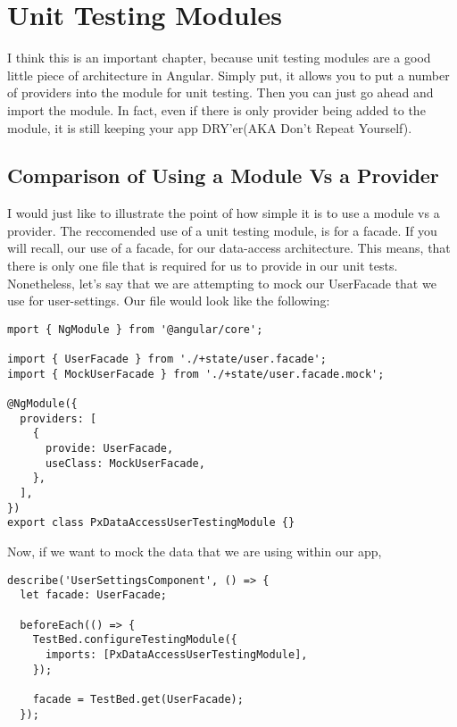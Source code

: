 \maketitle{}
\section{ Unit Testing Modules }
I think this is an important chapter, because unit testing modules are a good
little piece of architecture in Angular. Simply put, it allows you to put a
number of providers into the module for unit testing. Then you can just go
ahead and import the module. In fact, even if there is only provider being
added to the module, it is still keeping your app DRY'er(AKA Don't Repeat
Yourself).

\subsection{Comparison of Using a Module Vs a Provider}
I would just like to illustrate the point of how simple it is to use a module
vs a provider. The reccomended use of a unit testing module, is for a facade.
If you will recall, our use of a facade, for our data-access architecture. This
means, that there is only one file that is required for us to provide in our
unit tests. Nonetheless, let's say that we are attempting to mock our UserFacade
that we use for user-settings. Our file would look like the following:

\begin{lstlisting}
mport { NgModule } from '@angular/core';

import { UserFacade } from './+state/user.facade';
import { MockUserFacade } from './+state/user.facade.mock';

@NgModule({
  providers: [
    {
      provide: UserFacade,
      useClass: MockUserFacade,
    },
  ],
})
export class PxDataAccessUserTestingModule {}
\end{lstlisting}

Now, if we want to mock the data that we are using within our app,

\begin{lstlisting}
describe('UserSettingsComponent', () => {
  let facade: UserFacade;

  beforeEach(() => {
    TestBed.configureTestingModule({
      imports: [PxDataAccessUserTestingModule],
    });

    facade = TestBed.get(UserFacade);
  });
\end{lstlisting}
